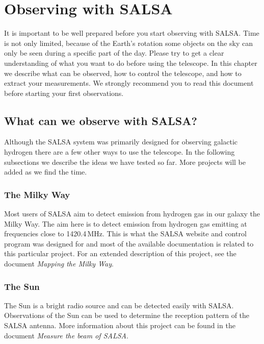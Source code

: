\chapter{Observing with SALSA}
It is important to be well prepared before you start observing with SALSA.
Time is not only limited, because of the Earth's rotation some objects on the
sky can only be seen during a specific part of the day.  Please try to get a
clear understanding of what you want to do before using the telescope.  In this
chapter we describe what can be observed, how to control the telescope, and how
to extract your measurements. We strongly recommend you to read this document
before starting your first observations. 

\section{What can we observe with SALSA?}
Although the SALSA system was primarily designed for observing galactic
hydrogen there are a few other ways to use the telescope. In the following
subsections we describe the ideas we have tested so far. More projects
will be added as we find the time.

\subsection{The Milky Way}
Most users of SALSA aim to detect emission from hydrogen gas in our galaxy the
Milky Way.  The aim here is to detect emission from hydrogen gas emitting at
frequencies close to 1420.4\,MHz.  This is what the SALSA website and control
program was designed for and most of the available documentation is related to
this particular project. For an extended description of this project, see the
document \emph{Mapping the Milky Way}.

\subsection{The Sun}
The Sun is a bright radio source and can be detected easily with SALSA. 
Observations of the Sun can be used to determine the reception pattern
of the SALSA antenna. More information about this project can be found
in the document \emph{Measure the beam of SALSA}.

